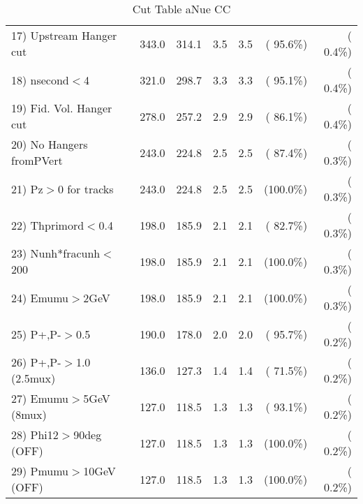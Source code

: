 \begin{table}[h!]
\begin{tabular}{||l||r|r|r|r|r|r||}
 17) Upstream Hanger cut  &        343.0 &        314.1 &          3.5 &          3.5 & ( 95.6\%) & (  0.4\%) \\
 18) nsecond$<$4          &        321.0 &        298.7 &          3.3 &          3.3 & ( 95.1\%) & (  0.4\%) \\
 19) Fid. Vol. Hanger cut &        278.0 &        257.2 &          2.9 &          2.9 & ( 86.1\%) & (  0.4\%) \\
 20) No Hangers fromPVert &        243.0 &        224.8 &          2.5 &          2.5 & ( 87.4\%) & (  0.3\%) \\
 21) Pz$>$0 for tracks    &        243.0 &        224.8 &          2.5 &          2.5 & (100.0\%) & (  0.3\%) \\
 22) Thprimord$<$0.4      &        198.0 &        185.9 &          2.1 &          2.1 & ( 82.7\%) & (  0.3\%) \\
 23) Nunh*fracunh$<$200   &        198.0 &        185.9 &          2.1 &          2.1 & (100.0\%) & (  0.3\%) \\
 24) Emumu$>$2GeV         &        198.0 &        185.9 &          2.1 &          2.1 & (100.0\%) & (  0.3\%) \\
 25) P+,P-$>$0.5          &        190.0 &        178.0 &          2.0 &          2.0 & ( 95.7\%) & (  0.2\%) \\
 26) P+,P-$>$1.0 (2.5mux) &        136.0 &        127.3 &          1.4 &          1.4 & ( 71.5\%) & (  0.2\%) \\
 27) Emumu$>$5GeV  (8mux) &        127.0 &        118.5 &          1.3 &          1.3 & ( 93.1\%) & (  0.2\%) \\
 28) Phi12$>$90deg  (OFF) &        127.0 &        118.5 &          1.3 &          1.3 & (100.0\%) & (  0.2\%) \\
 29) Pmumu$>$10GeV  (OFF) &        127.0 &        118.5 &          1.3 &          1.3 & (100.0\%) & (  0.2\%) \\
 \hline
 \hline
 \end{tabular}
 \caption{Cut Table  aNue CC  }
 \label{tab-cutcohjpsi-mumu_anuecc}
 \end{table}
